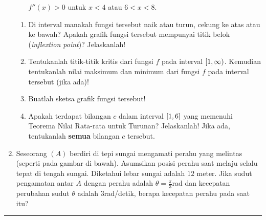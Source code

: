 \begin{enumerate}[leftmargin=*, label={\arabic*}.]
\begin{itemize}
    $f''(x)>0$ untuk $x<4$ atau $6 < x < 8$.
    \end{itemize}
    \begin{enumerate}[label={\alph*}.]
    \item Di interval manakah fungsi tersebut naik atau turun, cekung ke atas atau 
    ke bawah? Apakah grafik fungsi tersebut mempunyai titik belok 
    (\textit{inflextion point})? Jelaskanlah!
    \item Tentukanlah titik-titik kritis dari fungsi $f$ pada interval 
    $\cio*{1,\infty}$. Kemudian tentukanlah nilai maksimum dan minimum dari fungsi $f$ 
    pada interval tersebut (jika ada)!
    \item Buatlah sketsa grafik fungsi tersebut!
    \item Apakah terdapat bilangan $c$ dalam interval $\cic*{1,6}$ yang memenuhi 
    Teorema Nilai Rata-rata untuk Turunan? Jelaskanlah! Jika ada, tentukanlah \textbf{semua} 
    bilangan $c$ tersebut.
    \end{enumerate}
\item Seseorang $(A)$ berdiri di tepi sungai mengamati perahu yang melintas (seperti pada 
gambar di bawah). Asumsikan posisi perahu saat melaju selalu tepat di tengah sungai. Diketahui 
lebar sungai adalah $12$ meter. Jika sudut pengamatan antar $A$ dengan perahu adalah 
$\theta =\frac{\pi}{3}$rad dan kecepatan perubahan sudut $\theta$ adalah $3$rad/detik, berapa 
kecepatan perahu pada saat itu?



\end{enumerate}


\vspace{0.2cm}\hrule height 1pt\vspace{0.5cm}


